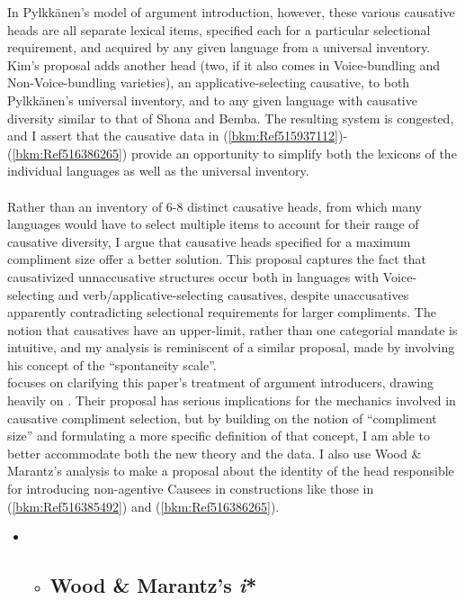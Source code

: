 \documentclass[output=paper,modfonts,nonflat]{langsci/langscibook}
\begin{document}
In Pylkkänen’s model of argument introduction, however, these various causative heads are all separate lexical items, specified each for a particular selectional requirement, and acquired by any given language from a universal inventory. Kim’s proposal adds another head (two, if it also comes in Voice-bundling and Non-Voice-bundling varieties), an applicative-selecting causative, to both Pylkkänen’s universal inventory, and to any given language with causative diversity similar to that of Shona and Bemba. The resulting system is congested, and I assert that the causative data in (\ref{bkm:Ref515937112}){}-(\ref{bkm:Ref516386265}) provide an opportunity to simplify both the lexicons of the individual languages as well as the universal inventory. \\
\\
Rather than an inventory of 6-8 distinct causative heads, from which many languages would have to select multiple items to account for their range of causative diversity, I argue that causative heads specified for a maximum compliment size offer a better solution. This proposal captures the fact that causativized unnaccusative structures occur both in languages with Voice-selecting and verb/applicative-selecting causatives, despite unaccusatives apparently contradicting selectional requirements for larger compliments. The notion that causatives have an upper-limit, rather than one categorial mandate is intuitive, and my analysis is reminiscent of a similar proposal, made by \citet{Haspelmath2016} involving his concept of the “spontaneity scale”. \\

 focuses on clarifying this paper’s treatment of argument introducers, drawing heavily on \citet{WoodMarantz2017}. Their proposal has serious implications for the mechanics involved in causative compliment selection, but by building on the notion of “compliment size” and formulating a more specific definition of that concept, I am able to better accommodate both the new theory and the data. I also use Wood \& Marantz’s analysis to make a proposal about the identity of the head responsible for introducing non-agentive Causees in constructions like those in (\ref{bkm:Ref516385492}) and (\ref{bkm:Ref516386265}).

\begin{itemize}
\item \begin{itemize}
\item \subsection{Wood \& Marantz’s \textit{i}*}
\end{itemize}
\end{itemize}
\end{document}

